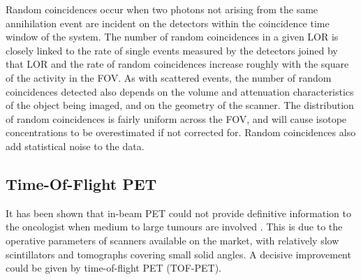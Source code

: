 Random coincidences occur when two photons not arising from the same annihilation event are incident on the detectors within the coincidence time window of the system. The number of random coincidences in a given LOR is closely linked to the rate of single events measured by the detectors joined by that LOR and the rate of random coincidences increase roughly with the square of the activity in the FOV. As with scattered events, the number of random coincidences detected also depends on the volume and attenuation characteristics of the object being imaged, and on the geometry of the scanner. The distribution of random coincidences is fairly uniform across the FOV, and will cause isotope concentrations to be overestimated if not corrected for. Random coincidences also add statistical noise to the data.
\newpage
\subsection{Time-Of-Flight PET}

It has been shown that in-beam PET could not provide definitive information to the oncologist when medium to large tumours are involved \cite{Fiedler2006}. This is due to the operative parameters of scanners available on the market, with relatively slow scintillators and tomographs covering small solid angles. A decisive improvement could be given by time-of-flight PET (TOF-PET).

